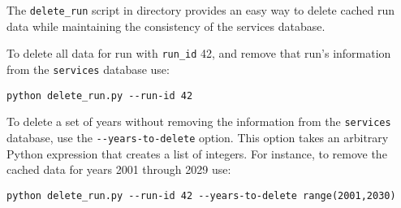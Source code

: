 The \verb|delete_run| script in  directory
provides an easy way to delete cached run data while maintaining the
consistency of the services database. 

To delete all data for run with \verb|run_id| 42, and remove that run's
information from the \verb|services|
database use:

\begin{verbatim}
python delete_run.py --run-id 42
\end{verbatim}

To delete a set of years without removing the information from the
\verb|services| database, use the \verb|--years-to-delete| option.  This
option takes an arbitrary Python expression that creates a list of integers.
For instance, to remove the cached data for years 2001 through 2029 use:

\begin{verbatim}
python delete_run.py --run-id 42 --years-to-delete range(2001,2030)
\end{verbatim}

